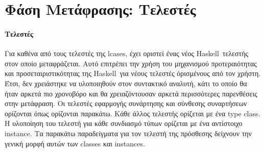 \documentclass[diploma]{softlab-thesis}
\def\H{Haskell}
\begin{document}
\newpage

\section{Φάση Μετάφρασης: Τελεστές}

\paragraph{Τελεστές}

Για καθένα από τους τελεστές της lcases, έχει οριστεί ένας νέος \H\ τελεστής
στον οποίο μεταφράζεται. Αυτό επιτρέπει την χρήση του μηχανισμού προτεραιότητας
και προσεταιριστικότητας της \H\ για νέους τελεστές όρισμένους από τον χρήστη.
Έτσι, δεν χρειάστηκε να υλοποιηθούν στον συντακτικό αναλυτή, κάτι το οποίο θα
ήταν αρκετά πιο χρονοβόρο και θα χρειαζόντουσαν αρκετά περισσότερες παρενθέσεις
στην μετάφραση. Οι τελεστές εφαρμογής συνάρτησης και σύνθεσης συναρτήσεων
ορίζονται όπως ορίζονται παρακάτω. Κάθε άλλος τελεστής ορίζεται με ένα type
class.  Η υλοποίηση του τελεστή για κάθε συνδιασμό τύπων ορίζεται με ένα
αντίστοιχο instance. Τα παρακάτω παραδείγματα για τον τελεστή της πρόσθεσης
δείχνουν την γενική μορφή αυτών των classes και instances.
\\
\end{document}
